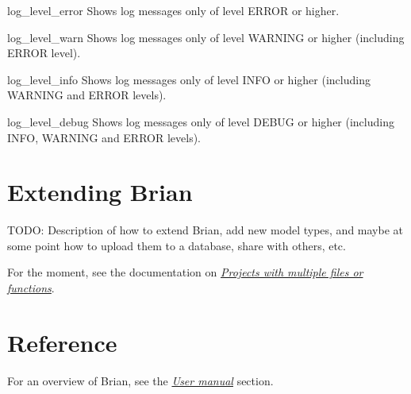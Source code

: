 \documentclass[letterpaper,10pt,english]{manual}
\begin{document}
\hypertarget{brian.log_level_error}{}\begin{funcdesc}{log\_level\_error}{}
Shows log messages only of level ERROR or higher.
\end{funcdesc}

\hypertarget{brian.log_level_warn}{}\begin{funcdesc}{log\_level\_warn}{}
Shows log messages only of level WARNING or higher (including ERROR level).
\end{funcdesc}

\hypertarget{brian.log_level_info}{}\begin{funcdesc}{log\_level\_info}{}
Shows log messages only of level INFO or higher (including WARNING and ERROR levels).
\end{funcdesc}

\hypertarget{brian.log_level_debug}{}\begin{funcdesc}{log\_level\_debug}{}
Shows log messages only of level DEBUG or higher (including INFO, WARNING and ERROR levels).
\end{funcdesc}

\resetcurrentobjects
\hypertarget{--doc-extending}{}

\chapter{Extending Brian}

TODO: Description of how to extend Brian, add new model types, and maybe at
some point how to upload them to a database, share with others, etc.

For the moment, see the documentation on \hyperlink{projects-with-multiple-files}{\emph{Projects with multiple files or functions}}.

\resetcurrentobjects
\hypertarget{--doc-reference}{}

\chapter{Reference}

For an overview of Brian, see the \hyperlink{user-manual}{\emph{User manual}} section.

\resetcurrentobjects
\hypertarget{--doc-reference-scipy}{}
\end{document}
